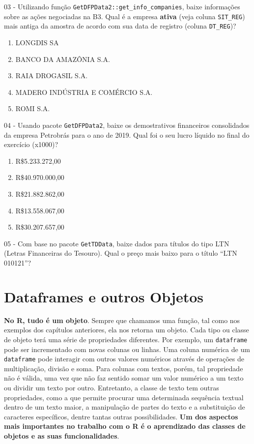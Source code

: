 \documentclass[
  11pt,
]{book}
\providecommand{\tightlist}{%
  \setlength{\itemsep}{0pt}\setlength{\parskip}{0pt}}
\begin{document}
03 -
Utilizando função \texttt{GetDFPData2::get\_info\_companies}, baixe informações sobre as ações negociadas na B3. Qual é a empresa \textbf{ativa} (veja coluna \texttt{SIT\_REG}) mais antiga da amostra de acordo com sua data de registro (coluna \texttt{DT\_REG})?

\begin{enumerate}
\def\labelenumi{\alph{enumi})}
\tightlist
\item
  LONGDIS SA
\item
  BANCO DA AMAZÔNIA S.A.
\item
  RAIA DROGASIL S.A.
\item
  MADERO INDÚSTRIA E COMÉRCIO S.A.
\item
  ROMI S.A.
\end{enumerate}

04 -
Usando pacote \texttt{GetDFPData2}, baixe os demostrativos financeiros consolidados da empresa Petrobrás para o ano de 2019. Qual foi o seu lucro líquido no final do exercício (x1000)?

\begin{enumerate}
\def\labelenumi{\alph{enumi})}
\tightlist
\item
  R\$5.233.272,00
\item
  R\$40.970.000,00
\item
  R\$21.882.862,00
\item
  R\$13.558.067,00
\item
  R\$30.207.657,00
\end{enumerate}

05 -
Com base no pacote \texttt{GetTDData}, baixe dados para títulos do tipo LTN (Letras Financeiras do Tesouro). Qual o preço mais baixo para o título ``LTN 010121''?

\hypertarget{classe-estrutura}{%
\chapter{Dataframes e outros Objetos}\label{classe-estrutura}}

\textbf{No R, tudo é um objeto}. Sempre que chamamos uma função, tal como nos exemplos dos capítulos anteriores, ela nos retorna um objeto. Cada tipo ou classe de objeto terá uma série de propriedades diferentes. Por exemplo, um \texttt{dataframe} pode ser incrementado com novas colunas ou linhas. Uma coluna numérica de um \texttt{dataframe} pode interagir com outros valores numéricos através de operações de multiplicação, divisão e soma. Para colunas com textos, porém, tal propriedade não é válida, uma vez que não faz sentido somar um valor numérico a um texto ou dividir um texto por outro. Entretanto, a classe de texto tem outras propriedades, como a que permite procurar uma determinada sequência textual dentro de um texto maior, a manipulação de partes do texto e a substituição de caracteres específicos, dentre tantas outras possibilidades. \textbf{Um dos aspectos mais importantes no trabalho com o R é o aprendizado das classes de objetos e as suas funcionalidades}.
\end{document}
